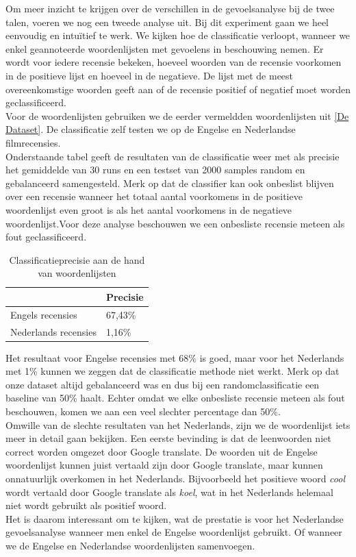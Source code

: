 Om meer inzicht te krijgen over de verschillen in de gevoelsanalyse bij de twee talen, voeren we nog een tweede analyse uit. Bij dit experiment gaan we heel eenvoudig en intu\"itief te werk. We kijken hoe de classificatie verloopt, wanneer we enkel geannoteerde woordenlijsten met gevoelens in beschouwing nemen. Er wordt voor iedere recensie bekeken, hoeveel woorden van de recensie voorkomen in de positieve lijst en hoeveel in de negatieve. De lijst met de meest overeenkomstige woorden geeft aan of de recensie positief of negatief moet worden geclassificeerd.\\
Voor de woordenlijsten gebruiken we de eerder vermeldden woordenlijsten uit \ref{De Dataset}. De classificatie zelf testen we op de Engelse en Nederlandse filmrecensies.\\
Onderstaande tabel geeft de resultaten van de classificatie weer met als precisie het gemiddelde van 30 runs en een testset van 2000 samples random en gebalanceerd samengesteld. Merk op dat de classifier kan ook onbeslist blijven over een recensie wanneer het totaal aantal voorkomens in de positieve woordenlijst even groot is als het aantal voorkomens in de negatieve woordenlijst.Voor deze analyse beschouwen we een onbesliste recensie meteen als fout geclassificeerd.

\begin{table}[h]
\centering
\begin{tabular}{l|l|}
\cline{2-2}
                                           & Precisie \\ \hline
\multicolumn{1}{|l|}{Engels recensies}     & 67,43\%  \\ \hline
\multicolumn{1}{|l|}{Nederlands recensies} & 1,16\%   \\ \hline
\end{tabular}
\caption{Classificatieprecisie aan de hand van woordenlijsten}
\end{table}

 Het resultaat voor Engelse recensies met 68\% is goed, maar voor het Nederlands met 1\% kunnen we zeggen dat de classificatie methode niet werkt. Merk op dat onze dataset altijd gebalanceerd was en dus bij een randomclassificatie een baseline van 50\% haalt. Echter omdat we elke onbesliste recensie meteen als fout beschouwen, komen we aan een veel slechter percentage dan 50\%.\\
 Omwille van de slechte resultaten van het Nederlands, zijn we de woordenlijst iets meer in detail gaan bekijken. Een eerste bevinding is dat de leenwoorden niet correct worden omgezet door Google translate. De woorden uit de Engelse woordenlijst kunnen juist vertaald zijn door Google translate, maar kunnen onnatuurlijk overkomen in het Nederlands. Bijvoorbeeld het positieve woord \textit{cool} wordt vertaald door Google translate als \textit{koel}, wat in het Nederlands helemaal niet wordt gebruikt als positief woord.\\
 Het is daarom interessant om te kijken, wat de prestatie is voor het Nederlandse gevoelsanalyse wanneer men enkel de Engelse woordenlijst gebruikt. Of wanneer we de Engelse en Nederlandse woordenlijsten samenvoegen.


